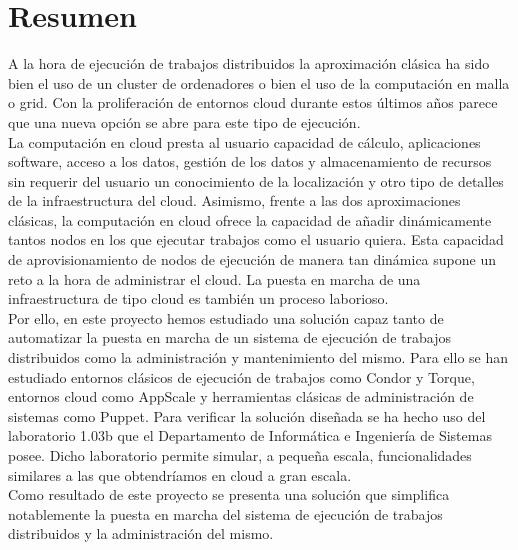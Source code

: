 \chapter{Resumen}

{\sf

A la hora de ejecución de trabajos distribuidos la aproximación clásica ha sido bien el uso de un cluster de ordenadores o bien el uso de la computación en malla o grid. Con la proliferación de entornos cloud durante estos últimos años parece que una nueva opción se abre para este tipo de ejecución.\\

La computación en cloud presta al usuario capacidad de cálculo, aplicaciones software, acceso a los datos, gestión de los datos y almacenamiento de recursos sin requerir del usuario un conocimiento de la localización y otro tipo de detalles de la infraestructura del cloud. Asimismo, frente a las dos aproximaciones clásicas, la computación en cloud ofrece la capacidad de añadir dinámicamente tantos nodos en los que ejecutar trabajos como el usuario quiera. Esta capacidad de aprovisionamiento de nodos de ejecución de manera tan dinámica supone un reto a la hora de administrar el cloud. La puesta en marcha de una infraestructura de tipo cloud es también un proceso laborioso.\\

Por ello, en este proyecto hemos estudiado una solución capaz tanto de automatizar la puesta en marcha de un sistema de ejecución de trabajos distribuidos como la administración y mantenimiento del mismo. Para ello se han estudiado entornos clásicos de ejecución de trabajos como Condor y Torque, entornos cloud como AppScale y herramientas clásicas de administración de sistemas como Puppet. Para verificar la solución diseñada se ha hecho uso del laboratorio 1.03b que el Departamento de Informática e Ingeniería de Sistemas posee. Dicho laboratorio permite simular, a pequeña escala, funcionalidades similares a las que obtendríamos en cloud a gran escala.\\

Como resultado de este proyecto se presenta una solución que simplifica notablemente la puesta en marcha del sistema de ejecución de trabajos distribuidos y la administración del mismo.
}
